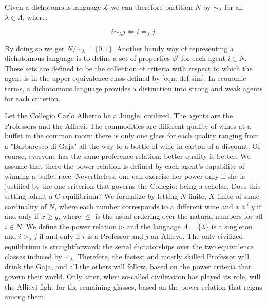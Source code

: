 Given a dichotomous language $\mathcal{L}$ we can therefore partition $N$ by $\sim_{\lambda}$ for all $\lambda\in\Lambda$, where:

\begin{equation}\label{eqn: def sim}
    i\sim_{\lambda} j \Leftrightarrow i=_{\lambda}j.
\end{equation}

By doing so we get $N/\sim_{\lambda}=\{0,1\}$. Another handy way of representing a dichotomous language is to define a set of properties $\phi^i$ for each agent $i\in N$. These sets are defined to be the collection of criteria with respect to which the agent is in the upper equivalence class defined by \cref{eqn: def sim}. In economic terms, a dichotomous language provides a distinction into strong and weak agents for each criterion. 


\begin{example}\label{Example: CCA}
    Let the Collegio Carlo Alberto be a Jungle, civilized. The agents are the Professors and the Allievi. The commodities are different quality of wines at a buffet in the common room: there is only one glass for each quality ranging from a "Barbaresco di Gaja" all the way to a bottle of wine in carton of a discount. Of course, everyone has the same preference relation: better quality is better. We assume that there the power relation is defined by each agent's capability of winning a buffet race. Nevertheless, one can exercise her power only if she is justified by the one criterion that governs the Collegio: being a scholar. Does this setting admit a C equilibrium? We formalize by letting $N$ finite, $X$ finite of same cardinality of $N$, where each number corresponds to a different wine and $x\succeq^i y$ if and only if $x\geq y$, where $\leq$ is the usual ordering over the natural numbers for all $i\in N$. We define the power relation $\triangleright$ and the language $\Lambda=\{\lambda\}$ is a singleton and $i>_{\lambda}j$ if and only if $i$ is a Professor and $j$ an Allievo. The only civilized equilibrium is straightforward: the serial dictatorships over the two equivalence classes induced by $\sim_{\lambda}$. Therefore, the fastest and mostly skilled Professor will drink the Gaja, and all the others will follow, based on the power criteria that govern their world. Only after, when so-called civilization has played its role, will the Allievi fight for the remaining glasses, based on the power relation that reigns among them. 

\end{example}


